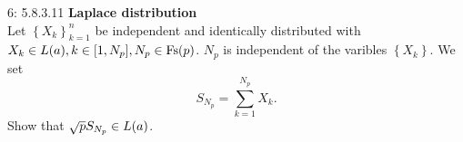 \documentclass[a4paper,twoside=false,abstract=false,numbers=noenddot,
titlepage=false,headings=small,parskip=half,version=last]{scrartcl}
\begin{document}

\begin{exercise}{6: 5.8.3.11} \textbf{Laplace distribution} \\
    Let $\left\{{X_k}\right\}_{k=1}^n$ be independent and identically
    distributed with
    ${X_k \in\text{$L$}(a),}\, {k\in[1,N_p],}\, {N_p\in \text{Fs}(p)}$.
    $N_p$ is independent of the varibles $\left\{X_k\right\}$. We set
    \begin{equation}
        S_{N_p} = \sum\limits_{k=1}^{N_p}X_k.
    \end{equation}
    Show that $\sqrt{p}S_{N_p}\in\text{$L$}(a)$.
\end{exercise}
\begin{solution}
\end{solution}
\pagebreak

\end{document}
